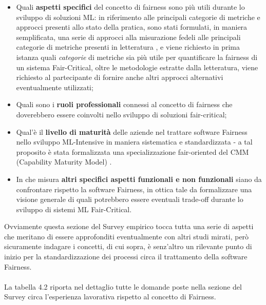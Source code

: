    \begin{itemize}
       \item Quali \textbf{aspetti specifici} del concetto di fairness sono più utili durante lo sviluppo di soluzioni ML: in riferimento alle principali categorie di metriche e approcci presenti allo stato della pratica, sono stati formulati, in maniera semplificata, una serie di approcci alla misurazione fedeli alle principali categorie di metriche presenti in letteratura  \cite{FairnessDefinitionExplained}, e viene richiesto in prima istanza quali \emph{categorie} di metriche sia più utile per quantificare la fairness di un sistema Fair-Critical, oltre le metodologie estratte dalla letteratura, viene richiesto al partecipante di fornire anche altri approcci alternativi eventualmente utilizzati;
       \item Quali sono i \textbf{ruoli professionali} connessi al concetto di fairness che doverebbero essere coinvolti nello sviluppo di soluzioni fair-critical;
       \item Qual'è il \textbf{livello di maturità} delle aziende nel trattare software Fairness nello sviluppo ML-Intensive in maniera sistematica e standardizzata - a tal proposito è stata formalizzata una specializzazione fair-oriented del CMM (Capability Maturity Model) \cite{CMM}.
       \item In che misura \textbf{altri specifici aspetti funzionali e non funzionali} siano da confrontare rispetto la software Fairness, in ottica tale da formalizzare una visione generale di quali potrebbero essere eventuali trade-off durante lo sviluppo di sistemi ML Fair-Critical.
   \end{itemize}
   
   Ovviamente questa sezione del Survey empirico tocca tutta una serie di aspetti che meritano di essere approfonditi eventualmente con altri studi mirati, però sicuramente indagare i concetti, di cui sopra, è senz'altro un rilevante punto di inizio per la standardizzazione dei processi circa il trattamento della software Fairness. \\\\
   
   La tabella 4.2 riporta nel dettaglio tutte le domande poste nella sezione del Survey circa l'esperienza lavorativa rispetto al concetto di Fairness.
   
